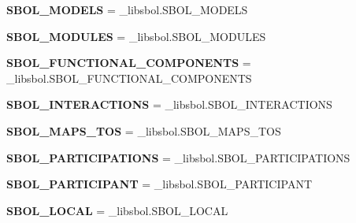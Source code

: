 \begin{DoxyCompactItemize}
\item 
{\bfseries S\+B\+O\+L\+\_\+\+M\+O\+D\+E\+LS} = \+\_\+libsbol.\+S\+B\+O\+L\+\_\+\+M\+O\+D\+E\+LS\hypertarget{namespacesbol_1_1libsbol_af3ecbea813e892f6a492b1beb478f3da}{}\label{namespacesbol_1_1libsbol_af3ecbea813e892f6a492b1beb478f3da}

\item 
{\bfseries S\+B\+O\+L\+\_\+\+M\+O\+D\+U\+L\+ES} = \+\_\+libsbol.\+S\+B\+O\+L\+\_\+\+M\+O\+D\+U\+L\+ES\hypertarget{namespacesbol_1_1libsbol_a7a3da6973b1b9aad0c9e42dc856727b2}{}\label{namespacesbol_1_1libsbol_a7a3da6973b1b9aad0c9e42dc856727b2}

\item 
{\bfseries S\+B\+O\+L\+\_\+\+F\+U\+N\+C\+T\+I\+O\+N\+A\+L\+\_\+\+C\+O\+M\+P\+O\+N\+E\+N\+TS} = \+\_\+libsbol.\+S\+B\+O\+L\+\_\+\+F\+U\+N\+C\+T\+I\+O\+N\+A\+L\+\_\+\+C\+O\+M\+P\+O\+N\+E\+N\+TS\hypertarget{namespacesbol_1_1libsbol_a449cfce34012e98effcb165ef63c7df6}{}\label{namespacesbol_1_1libsbol_a449cfce34012e98effcb165ef63c7df6}

\item 
{\bfseries S\+B\+O\+L\+\_\+\+I\+N\+T\+E\+R\+A\+C\+T\+I\+O\+NS} = \+\_\+libsbol.\+S\+B\+O\+L\+\_\+\+I\+N\+T\+E\+R\+A\+C\+T\+I\+O\+NS\hypertarget{namespacesbol_1_1libsbol_a9014928b8f5ac95c082f73f3fb73d508}{}\label{namespacesbol_1_1libsbol_a9014928b8f5ac95c082f73f3fb73d508}

\item 
{\bfseries S\+B\+O\+L\+\_\+\+M\+A\+P\+S\+\_\+\+T\+OS} = \+\_\+libsbol.\+S\+B\+O\+L\+\_\+\+M\+A\+P\+S\+\_\+\+T\+OS\hypertarget{namespacesbol_1_1libsbol_ab6fbc9b14f3d1098bdaef6036c4915f6}{}\label{namespacesbol_1_1libsbol_ab6fbc9b14f3d1098bdaef6036c4915f6}

\item 
{\bfseries S\+B\+O\+L\+\_\+\+P\+A\+R\+T\+I\+C\+I\+P\+A\+T\+I\+O\+NS} = \+\_\+libsbol.\+S\+B\+O\+L\+\_\+\+P\+A\+R\+T\+I\+C\+I\+P\+A\+T\+I\+O\+NS\hypertarget{namespacesbol_1_1libsbol_a720d6cf7eaeae48a9ced0bcecae83eb0}{}\label{namespacesbol_1_1libsbol_a720d6cf7eaeae48a9ced0bcecae83eb0}

\item 
{\bfseries S\+B\+O\+L\+\_\+\+P\+A\+R\+T\+I\+C\+I\+P\+A\+NT} = \+\_\+libsbol.\+S\+B\+O\+L\+\_\+\+P\+A\+R\+T\+I\+C\+I\+P\+A\+NT\hypertarget{namespacesbol_1_1libsbol_ad53e59fa876d6872bbfafbee142122e5}{}\label{namespacesbol_1_1libsbol_ad53e59fa876d6872bbfafbee142122e5}

\item 
{\bfseries S\+B\+O\+L\+\_\+\+L\+O\+C\+AL} = \+\_\+libsbol.\+S\+B\+O\+L\+\_\+\+L\+O\+C\+AL\hypertarget{namespacesbol_1_1libsbol_a9575310c9ff430e2079a73b3d3e83ac3}{}\label{namespacesbol_1_1libsbol_a9575310c9ff430e2079a73b3d3e83ac3}


\end{DoxyCompactItemize}
